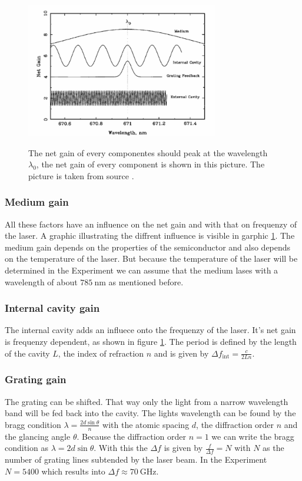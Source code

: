 \begin{figure}
    \centering
    \caption{The net gain of every componentes should peak at the wavelength $\lambda_0$, the net gain of every component is shown in this picture. The picture is taken from source \cite[6]{anleitung_laser}.}
    \includegraphics[width=0.75\textwidth]{content/data/netgain}
    \label{fig:netgain}
\end{figure}

\subsubsection{Medium gain}
All these factors have an influence on the net gain and with that on frequenzy of the laser.
A graphic illustrating the diffrent influence is visible in garphic \ref{fig:netgain}.
The medium gain depends on the properties of the semiconductor and also depends on the temperature of the laser.
But because the temperature of the laser will be determined in the Experiment we can assume that the medium lases with a wavelength of about $\SI{785}{\nano\meter}$ as mentioned before.

\subsubsection{Internal cavity gain}
The internal cavity adds an influece onto the frequenzy of the laser.
It's net gain is frequenzy dependent, as shown in figure \ref{fig:netgain}.
The period is defined by the length of the cavity $L$, the index of refraction $n$ and is given by
$\Delta f_\text{int} = \frac{c}{2Ln}$.

\subsubsection{Grating gain}
The grating can be shifted.
That way only the light from a narrow wavelength band will be fed back into the cavity.
The lights wavelength can be found by the bragg condition $\lambda = \frac{2d \sin{\theta}}{n}$ with the atomic spacing $d$, the diffraction order $n$ and the glancing angle $\theta$.
Because the diffraction order $n = 1$ we can write the bragg condition as $\lambda = 2d\sin{\theta}$.
With this the $\Delta f$ is given by $\frac{f}{\Delta f} = N$ with $N$ as the number of grating lines subtended by the laser beam.
In the Experiment $N=5400$ which results into $\Delta f \approx \SI{70}{\giga\Hz}$.

